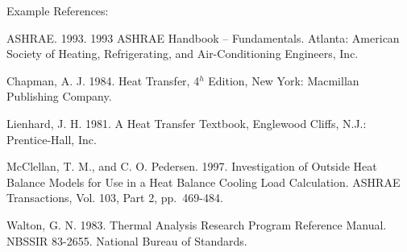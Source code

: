 Example References:

ASHRAE. 1993. 1993 ASHRAE Handbook -- Fundamentals. Atlanta: American Society of Heating, Refrigerating, and Air-Conditioning Engineers, Inc.

Chapman, A. J. 1984. Heat Transfer, 4\(^{h}\) Edition, New York: Macmillan Publishing Company.

Lienhard, J. H. 1981. A Heat Transfer Textbook, Englewood Cliffs, N.J.: Prentice-Hall, Inc.

McClellan, T. M., and C. O. Pedersen. 1997. Investigation of Outside Heat Balance Models for Use in a Heat Balance Cooling Load Calculation. ASHRAE Transactions, Vol. 103, Part 2, pp.~469-484.

Walton, G. N. 1983. Thermal Analysis Research Program Reference Manual. NBSSIR 83-2655. National Bureau of Standards.
